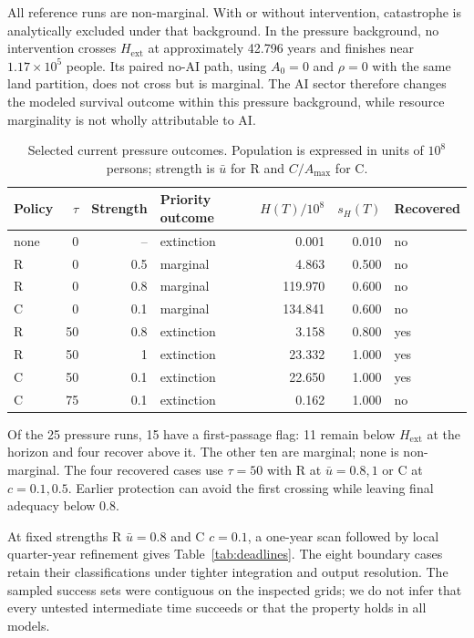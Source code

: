 \documentclass[12pt,a4paper]{article}
\theoremstyle{remark}
\newcommand{\Hext}{H_{\mathrm{ext}}}
\begin{document}
All reference runs are non-marginal. With or without intervention, catastrophe is analytically excluded under that background. In the pressure background, no intervention crosses $\Hext$ at approximately 42.796 years and finishes near $1.17\times10^5$ people. Its paired no-AI path, using $A_0=0$ and $\rho=0$ with the same land partition, does not cross but is marginal. The AI sector therefore changes the modeled survival outcome within this pressure background, while resource marginality is not wholly attributable to AI.

\begin{table}[htbp]\centering\small
\caption{Selected current pressure outcomes. Population is expressed in units of $10^8$ persons; strength is $\bar u$ for R and $C/A_{\max}$ for C.}\label{tab:policyresults}
\begin{tabular}{@{}lrrlrrl@{}}\toprule
Policy & $\tau$ & Strength & Priority outcome & $H(T)/10^8$ & $s_H(T)$ & Recovered\\\midrule
none & 0 & -- & extinction & 0.001 & 0.010 & no\\
R & 0 & 0.5 & marginal & 4.863 & 0.500 & no\\
R & 0 & 0.8 & marginal & 119.970 & 0.600 & no\\
C & 0 & 0.1 & marginal & 134.841 & 0.600 & no\\
R & 50 & 0.8 & extinction & 3.158 & 0.800 & yes\\
R & 50 & 1 & extinction & 23.332 & 1.000 & yes\\
C & 50 & 0.1 & extinction & 22.650 & 1.000 & yes\\
C & 75 & 0.1 & extinction & 0.162 & 1.000 & no\\
\bottomrule\end{tabular}

\end{table}

Of the 25 pressure runs, 15 have a first-passage flag: 11 remain below $\Hext$ at the horizon and four recover above it. The other ten are marginal; none is non-marginal. The four recovered cases use $\tau=50$ with R at $\bar u=0.8,1$ or C at $c=0.1,0.5$. Earlier protection can avoid the first crossing while leaving final adequacy below 0.8.

At fixed strengths R $\bar u=0.8$ and C $c=0.1$, a one-year scan followed by local quarter-year refinement gives Table~\ref{tab:deadlines}. The eight boundary cases retain their classifications under tighter integration and output resolution. The sampled success sets were contiguous on the inspected grids; we do not infer that every untested intermediate time succeeds or that the property holds in all models.
\end{document}

